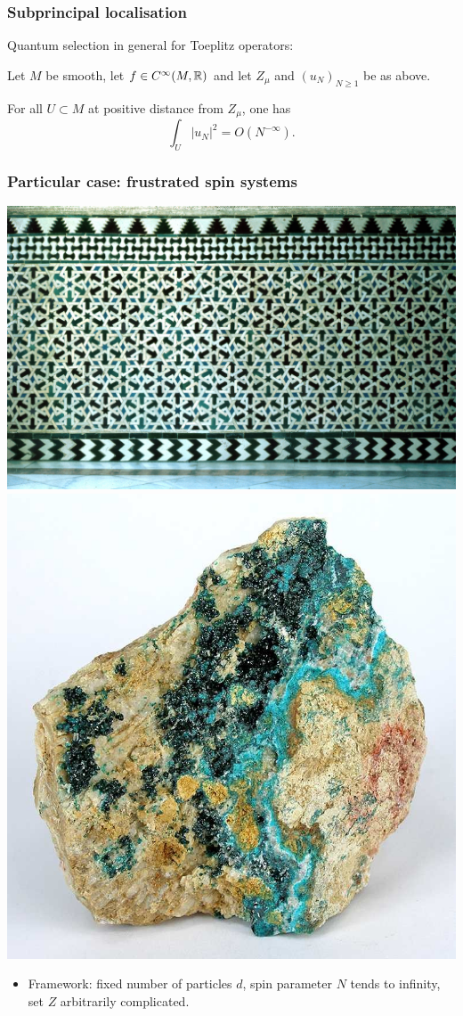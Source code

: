 \documentclass[mathserif]{beamer}
\newcommand{\mycite}[1]{{\color{mygreen} \small #1}}
\begin{document}
\begin{frame}
  \frametitle{Subprincipal localisation}
  Quantum selection in general for Toeplitz operators:
  \begin{theorem}[\mycite{[\underline{D. 2020?}]}]
    Let $M$ be smooth, let $f\in C^{\infty}(M,\mathbb{R})$ and let $Z_{\mu}$ and
    $(u_N)_{N\geq 1}$ be as above.

    For all $U\subset M$ at positive distance from $Z_{\mu}$, one has
    \[
      \int_U
      |u_N|^2=O(N^{-\infty}).
      \]
  \end{theorem}
\end{frame}

\begin{frame}
  \frametitle{Particular case: frustrated spin systems}
  \begin{center}
    \includegraphics[scale=6]{Alcazar.png}\includegraphics[scale=0.16]{Herbertsmithite.jpg}
  \end{center}
  \begin{itemize}
\item  Framework: fixed number of particles $d$, spin parameter $N$
  tends to infinity, set $Z$ arbitrarily complicated.


\end{itemize}
\end{frame}
\end{document}
